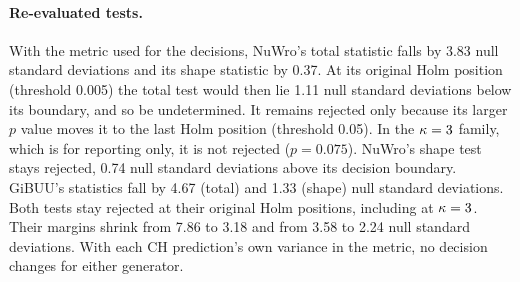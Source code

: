 \paragraph{Re-evaluated tests.} With the metric used for the decisions, NuWro's total statistic falls by 3.83 null standard deviations and its shape statistic by 0.37.  At its original Holm position (threshold 0.005) the total test would then lie 1.11 null standard deviations below its boundary, and so be undetermined.  It remains rejected only because its larger $p$ value moves it to the last Holm position (threshold 0.05). In the $\kappa=3$ family, which is for reporting only, it is not rejected ($p=0.075$). NuWro's shape test stays rejected, 0.74 null standard deviations above its decision boundary.  GiBUU's statistics fall by 4.67 (total) and 1.33 (shape) null standard deviations. Both tests stay rejected at their original Holm positions, including at $\kappa=3$. Their margins shrink from 7.86 to 3.18 and from 3.58 to 2.24 null standard deviations.  With each CH prediction's own variance in the metric, no decision changes for either generator.

